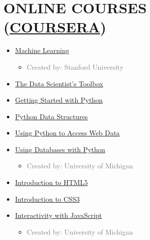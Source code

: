 \section{ONLINE COURSES (\href{http://www.coursera.com}{COURSERA})}
\begin{multicols}{2}
\begin{itemize}
	
	
	\item {}  \href{https://www.coursera.org/learn/machine-learning}{Machine Learning}
	\begin{itemize}
		\item \textcolor{gray}{Created by: Stanford University}
	\end{itemize}
	
	\item  {}  \href{https://www.coursera.org/learn/data-scientists-tools}{The Data Scientist's Toolbox} 

	\item {} \href{https://www.coursera.org/learn/python}{Getting Started with Python} 
	
	\item  {} \href{https://www.coursera.org/learn/python-data}{Python Data Structures}  
	
	\item {}  \href{https://www.coursera.org/learn/python-network-data}{Using Python to Access Web Data} 
	
	\item  {} \href{https://www.coursera.org/learn/python-databases}{Using Databases with Python}  
	\begin{itemize}
		\item \textcolor{gray}{Created by: University of Michigan}
	\end{itemize}

	\item  {} \href{https://www.coursera.org/learn/html}{Introduction to HTML5} 
	
	\item  {} \href{https://www.coursera.org/learn/introcss}{Introduction to CSS3} 
	
	\item  {} \href{https://www.coursera.org/learn/javascript}{Interactivity with JavaScript}  
	\begin{itemize}
		\item \textcolor{gray}{Created by: University of Michigan}
	\end{itemize}

\end{itemize}
\end{multicols}


